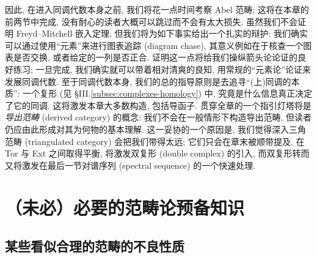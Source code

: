 \indent 因此, 在进入同调代数本身之前, 我们将花一点时间考察 Abel 范畴; 这将在本章的前两节中完成, 没有耐心的读者大概可以跳过而不会有太大损失. 虽然我们不会证明 Freyd–Mitchell 嵌入定理, 但我们将为如下事实给出一个扎实的辩护: 我们确实可以通过使用``元素''来进行图表追踪 (diagram chase), 其意义例如在于核查一个图表是否交换, 或者给定的一列是否正合. 证明这一点将给我们操纵箭头论论证的良好练习; 一旦完成, 我们确实就可以带着相对清爽的良知, 用常规的``元素论''论证来发展同调代数.
\indent 至于同调代数本身, 我们的总的指导原则是去追寻``(上)同调的本质'': 一个复形 (见 §III.\ref{subsec:complexes-homology}) 中, 究竟是什么信息真正决定了它的同调. 这将激发本章大多数构造, 包括导函子. 贯穿全章的一个指引灯塔将是\emph{导出范畴} (derived category) 的概念: 我们不会在一般情形下构造导出范畴, 但读者仍应由此形成对其为何物的基本理解. 这一妥协的一个原因是, 我们觉得深入三角范畴 (triangulated category) 会把我们带得太远; 它们只会在章末被顺带提及. 在 Tor 与 Ext 之间取得平衡, 将激发双复形 (double complex) 的引入, 而双复形转而又将激发在最后一节对谱序列 (spectral sequence) 的一个快速处理.

\section{（未必）必要的范畴论预备知识}
\label{sec:cat-preliminaries}

\subsection{某些看似合理的范畴的不良性质}
\label{subsec:undesirable-features}

